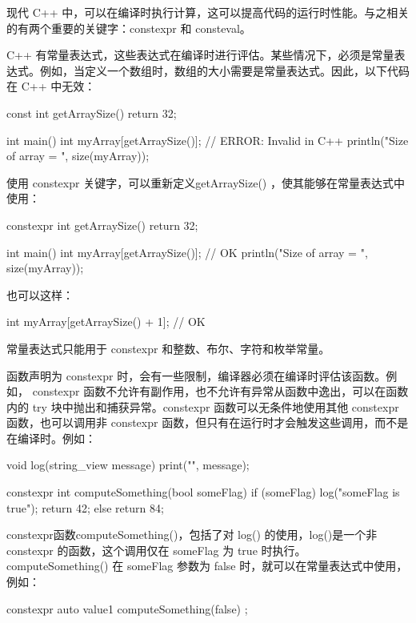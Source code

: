
现代 C++ 中，可以在编译时执行计算，这可以提高代码的运行时性能。与之相关的有两个重要的关键字：constexpr 和 consteval。


C++ 有常量表达式，这些表达式在编译时进行评估。某些情况下，必须是常量表达式。例如，当定义一个数组时，数组的大小需要是常量表达式。因此，以下代码在 C++ 中无效：

\begin{cpp}
const int getArraySize() { return 32; }

int main()
{
    int myArray[getArraySize()]; // ERROR: Invalid in C++
    println("Size of array = {}", size(myArray));
}
\end{cpp}

使用 constexpr 关键字，可以重新定义getArraySize() ，使其能够在常量表达式中使用：

\begin{cpp}
constexpr int getArraySize() { return 32; }

int main()
{
    int myArray[getArraySize()]; // OK
    println("Size of array = {}", size(myArray));
}
\end{cpp}

也可以这样：

\begin{cpp}
int myArray[getArraySize() + 1]; // OK
\end{cpp}

常量表达式只能用于 constexpr 和整数、布尔、字符和枚举常量。

函数声明为 constexpr 时，会有一些限制，编译器必须在编译时评估该函数。例如， constexpr 函数不允许有副作用，也不允许有异常从函数中逸出，可以在函数内的 try 块中抛出和捕获异常。constexpr 函数可以无条件地使用其他 constexpr 函数，也可以调用非 constexpr 函数，但只有在运行时才会触发这些调用，而不是在编译时。例如：

\begin{cpp}
void log(string_view message) { print("{}", message); }

constexpr int computeSomething(bool someFlag)
{
    if (someFlag) {
        log("someFlag is true");
        return 42;
    }
    else { return 84; }
}
\end{cpp}

constexpr函数computeSomething()，包括了对 log() 的使用，log()是一个非 constexpr 的函数，这个调用仅在 someFlag 为 true 时执行。 computeSomething() 在 someFlag 参数为 false 时，就可以在常量表达式中使用，例如：

\begin{cpp}
constexpr auto value1 { computeSomething(false) };
\end{cpp}


